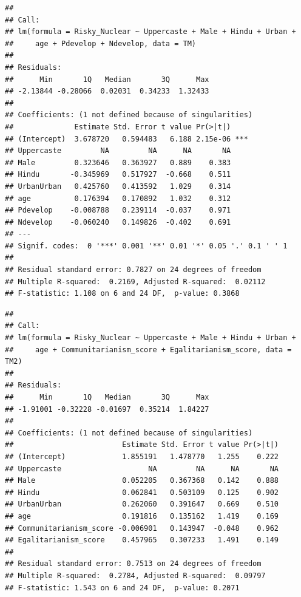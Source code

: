 \documentclass[
]{article}
\begin{document}
\begin{verbatim}
## 
## Call:
## lm(formula = Risky_Nuclear ~ Uppercaste + Male + Hindu + Urban + 
##     age + Pdevelop + Ndevelop, data = TM)
## 
## Residuals:
##      Min       1Q   Median       3Q      Max 
## -2.13844 -0.28066  0.02031  0.34233  1.32433 
## 
## Coefficients: (1 not defined because of singularities)
##              Estimate Std. Error t value Pr(>|t|)    
## (Intercept)  3.678720   0.594483   6.188 2.15e-06 ***
## Uppercaste         NA         NA      NA       NA    
## Male         0.323646   0.363927   0.889    0.383    
## Hindu       -0.345969   0.517927  -0.668    0.511    
## UrbanUrban   0.425760   0.413592   1.029    0.314    
## age          0.176394   0.170892   1.032    0.312    
## Pdevelop    -0.008788   0.239114  -0.037    0.971    
## Ndevelop    -0.060240   0.149826  -0.402    0.691    
## ---
## Signif. codes:  0 '***' 0.001 '**' 0.01 '*' 0.05 '.' 0.1 ' ' 1
## 
## Residual standard error: 0.7827 on 24 degrees of freedom
## Multiple R-squared:  0.2169, Adjusted R-squared:  0.02112 
## F-statistic: 1.108 on 6 and 24 DF,  p-value: 0.3868
\end{verbatim}

\begin{verbatim}
## 
## Call:
## lm(formula = Risky_Nuclear ~ Uppercaste + Male + Hindu + Urban + 
##     age + Communitarianism_score + Egalitarianism_score, data = TM2)
## 
## Residuals:
##      Min       1Q   Median       3Q      Max 
## -1.91001 -0.32228 -0.01697  0.35214  1.84227 
## 
## Coefficients: (1 not defined because of singularities)
##                         Estimate Std. Error t value Pr(>|t|)
## (Intercept)             1.855191   1.478770   1.255    0.222
## Uppercaste                    NA         NA      NA       NA
## Male                    0.052205   0.367368   0.142    0.888
## Hindu                   0.062841   0.503109   0.125    0.902
## UrbanUrban              0.262060   0.391647   0.669    0.510
## age                     0.191816   0.135162   1.419    0.169
## Communitarianism_score -0.006901   0.143947  -0.048    0.962
## Egalitarianism_score    0.457965   0.307233   1.491    0.149
## 
## Residual standard error: 0.7513 on 24 degrees of freedom
## Multiple R-squared:  0.2784, Adjusted R-squared:  0.09797 
## F-statistic: 1.543 on 6 and 24 DF,  p-value: 0.2071
\end{verbatim}
\end{document}

